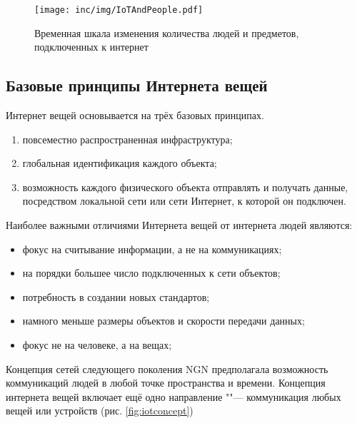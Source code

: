 \begin{figure}
  \centering
  \texttt{[image: inc/img/IoTAndPeople.pdf]}
	\caption{Временная шкала изменения количества людей и предметов, подключенных к интернет \cite{evans2011internet}}
  \label{fig:iotandpeople}
\end{figure}


\subsection{Базовые принципы Интернета вещей}

Интернет вещей основывается на трёх базовых принципах\cite{roslyakov2014}.
\begin{enumerate}
	\item повсеместно распространенная инфраструктура;
	\item глобальная идентификация каждого объекта;
	\item возможность каждого физического объекта отправлять и получать данные, посредством локальной сети или сети Интернет, к которой он подключен.
\end{enumerate}

Наиболее важными отличиями Интернета вещей от интернета людей являются:
\begin{itemize}
	\item фокус на считывание информации, а не на коммуникациях;
	\item на порядки большее число подключенных к сети объектов;
	\item потребность в создании новых стандартов;
	\item намного меньше размеры объектов и скорости передачи данных;
	\item фокус не на человеке, а на вещах;
\end{itemize}

Концепция сетей следующего поколения NGN предполагала возможность коммуникаций людей в любой точке пространства и времени.
Концепция интернета вещей включает ещё одно направление ""--- коммуникация любых вещей или устройств (рис. \ref{fig:iotconcept})

